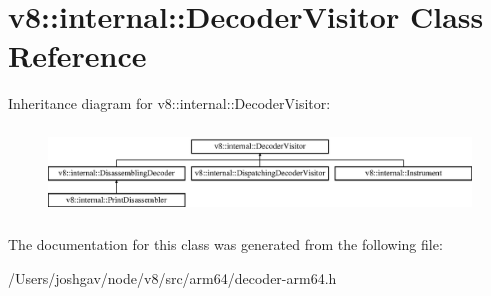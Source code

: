 \hypertarget{classv8_1_1internal_1_1_decoder_visitor}{}\section{v8\+:\+:internal\+:\+:Decoder\+Visitor Class Reference}
\label{classv8_1_1internal_1_1_decoder_visitor}
Inheritance diagram for v8\+:\+:internal\+:\+:Decoder\+Visitor\+:\begin{figure}[H]
\begin{center}
\leavevmode
\includegraphics[height=2.343096cm]{classv8_1_1internal_1_1_decoder_visitor}
\end{center}
\end{figure}


The documentation for this class was generated from the following file\+:\begin{DoxyCompactItemize}
\item 
/\+Users/joshgav/node/v8/src/arm64/decoder-\/arm64.\+h\end{DoxyCompactItemize}

